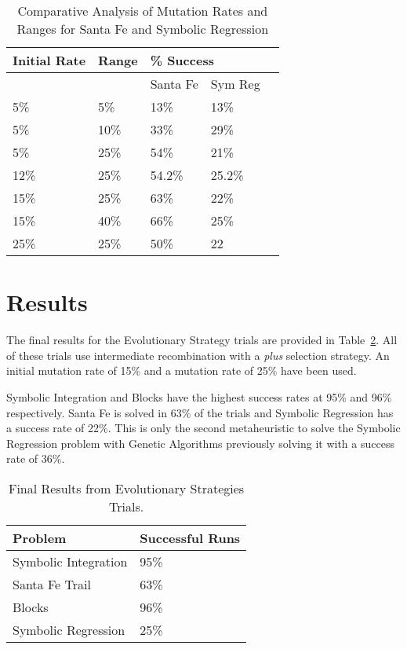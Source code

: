 \begin{table}[h]
\begin{center}
\begin{tabular}{|l|l|l|l|l|}
\hline
Initial Rate  &  Range & \multicolumn{2}{l|}{\% Success}  \\
\hline
              &        & Santa Fe & Sym Reg \\
\hline
5\% & 5\% & 13\%      & 13\% \\
5\% & 10\% & 33\%     & 29\% \\
5\% & 25\% & 54\%     & 21\% \\
12\% & 25\% & 54.2\%  & 25.2\%\\
15\% & 25\% & 63\%    & 22\%\\
15\% & 40\% & 66\%    & 25\%\\
25\% & 25\% & 50\%    & 22\ \\
\hline
\end{tabular}
\caption{\label{es_combined_mutation_rate} Comparative Analysis of Mutation Rates and Ranges for Santa Fe and Symbolic Regression}
\end{center}
\end{table}



\section{Results}

The final results for the Evolutionary Strategy trials are provided in Table~\ref{es_results_table}. All of these trials use intermediate recombination with a \emph{plus} selection strategy. An initial mutation rate of 15\% and a mutation rate of 25\% have been used.

Symbolic Integration and Blocks have the highest success rates at 95\% and 96\% respectively. Santa Fe is solved in 63\% of the trials and Symbolic Regression has a success rate of 22\%. This is only the second metaheuristic to solve the Symbolic Regression problem with Genetic Algorithms previously solving it with a success rate of 36\%. 


\begin{table}[h]
\begin{center}
\begin{tabular}{|l|l|}
\hline
Problem & Successful Runs \\
\hline
Symbolic Integration & 95\% \\
Santa Fe Trail & 63\% \\
Blocks & 96\% \\
Symbolic Regression & 25\% \\
\hline
\end{tabular}
\caption{ \label{es_results_table} Final Results from Evolutionary Strategies Trials.}
\end{center}
\end{table}




